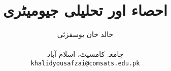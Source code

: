 \documentclass[leqno,b5paper]{book}
\author{
خالد خان یوسفزئی\\
\\
{\small {جامعہ کامسیٹ، اسلام آباد}}\\
\texttt{khalidyousafzai@comsats.edu.pk}
}
\title{احصاء اور تحلیلی جیومیٹری}
\date{}                           %
\begin{document}
\begin{urdufont}


\renewcommand*{\contentsname}{عنوان}    %
\renewcommand*{\proofname}{ثبوت}   %
\renewcommand*{\appendixname}{ضمیمہ}


\frontmatter                          %

\maketitle

\tableofcontents
\pagestyle{empty}
\newpage

\newpage

%


\mainmatter                      %
\renewcommand*{\chaptername}{باب}

\pagestyle{headings}




















\end{urdufont}
\end{document}
